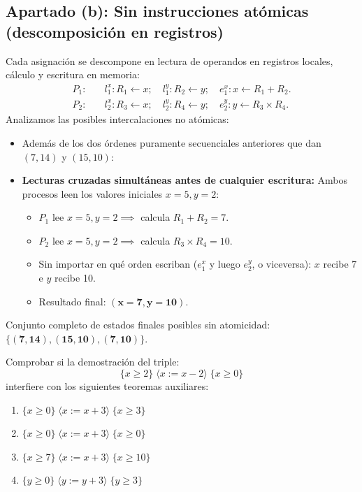 \begin{solucion}
\subsection*{Apartado (b): Sin instrucciones atómicas (descomposición en registros)}
Cada asignación se descompone en lectura de operandos en registros locales, cálculo y escritura en memoria:
\begin{align*}
P_1: \quad & l_1^x: R_1 \leftarrow x; \quad l_1^y: R_2 \leftarrow y; \quad e_1^x: x \leftarrow R_1 + R_2. \\
P_2: \quad & l_2^x: R_3 \leftarrow x; \quad l_2^y: R_4 \leftarrow y; \quad e_2^y: y \leftarrow R_3 \times R_4.
\end{align*}
Analizamos las posibles intercalaciones no atómicas:
\begin{itemize}[leftmargin=*]
    \item Además de los dos órdenes puramente secuenciales anteriores que dan $(7, 14)$ y $(15, 10)$:
    \item \textbf{Lecturas cruzadas simultáneas antes de cualquier escritura:}
    Ambos procesos leen los valores iniciales $x = 5, y = 2$:
    \begin{itemize}
        \item $P_1$ lee $x=5, y=2 \implies$ calcula $R_1 + R_2 = 7$.
        \item $P_2$ lee $x=5, y=2 \implies$ calcula $R_3 \times R_4 = 10$.
        \item Sin importar en qué orden escriban ($e_1^x$ y luego $e_2^y$, o viceversa):
        $x$ recibe 7 e $y$ recibe 10.
        \item Resultado final: $\mathbf{(x = 7, y = 10)}$.
    \end{itemize}
\end{itemize}
Conjunto completo de estados finales posibles sin atomicidad: $\mathbf{\{(7, 14), (15, 10), (7, 10)\}}$.
\end{solucion}

\begin{ejercicio}
Comprobar si la demostración del triple:
\[
\{x \ge 2\} \; \langle x := x - 2 \rangle \; \{x \ge 0\}
\]
interfiere con los siguientes teoremas auxiliares:
\begin{enumerate}[label=(\alph*),leftmargin=*]
    \item $\{x \ge 0\} \; \langle x := x + 3 \rangle \; \{x \ge 3\}$
    \item $\{x \ge 0\} \; \langle x := x + 3 \rangle \; \{x \ge 0\}$
    \item $\{x \ge 7\} \; \langle x := x + 3 \rangle \; \{x \ge 10\}$
    \item $\{y \ge 0\} \; \langle y := y + 3 \rangle \; \{y \ge 3\}$
\end{enumerate}
\end{ejercicio}

